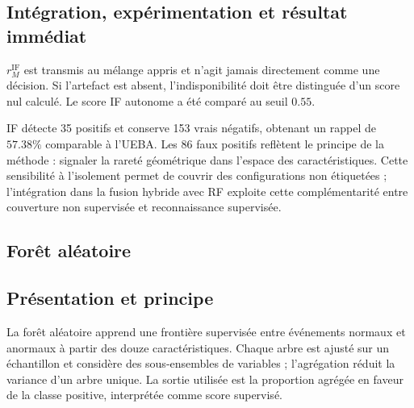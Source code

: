 \documentclass[11pt,a4paper,oneside]{report}
\theoremstyle{definition}
\theoremstyle{plain}
\begin{document}
\subsection*{Intégration, expérimentation et résultat immédiat}

$r_M^{\mathrm{IF}}$ est transmis au mélange appris et n'agit jamais directement comme une décision. Si l'artefact est absent, l'indisponibilité doit être distinguée d'un score nul calculé. Le score IF autonome a été comparé au seuil $0.55$.

\begin{table}[H]
\centering
\caption{Résultat archivé d'IF, $n=300$, seuil $0.55$.}
\label{tab:method-if-results}
\small
{}
\end{table}

IF détecte 35 positifs et conserve 153 vrais négatifs, obtenant un rappel de
$57.38\%$ comparable à l'UEBA. Les 86 faux positifs reflètent le principe de la
méthode : signaler la rareté géométrique dans l'espace des caractéristiques.
Cette sensibilité à l'isolement permet de couvrir des configurations non
étiquetées ; l'intégration dans la fusion hybride avec RF exploite cette
complémentarité entre couverture non supervisée et reconnaissance supervisée.

\subsection{Forêt aléatoire}
\label{sec:ai-ro-rf}

\subsection*{Présentation et principe}

La forêt aléatoire apprend une frontière supervisée entre événements normaux et anormaux à partir des douze caractéristiques. Chaque arbre est ajusté sur un échantillon et considère des sous-ensembles de variables ; l'agrégation réduit la variance d'un arbre unique. La sortie utilisée est la proportion agrégée en faveur de la classe positive, interprétée comme score supervisé.
\end{document}
